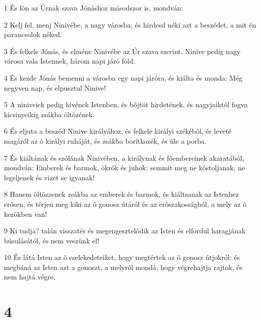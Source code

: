 \par 1 És lõn az Úrnak szava Jónáshoz másodszor is, mondván:
\par 2 Kelj fel, menj Ninivébe, a nagy városba, és hirdesd néki azt a beszédet, a mit én parancsolok néked.
\par 3 És felkele Jónás, és elméne Ninivébe az Úr szava szerint. Ninive pedig nagy városa vala Istennek, három napi járó föld.
\par 4 És kezde Jónás bemenni a városba egy napi járóra, és kiálta és monda: Még negyven nap, és elpusztul Ninive!
\par 5 A niniveiek pedig hivének Istenben, és bõjtöt hirdetének, és nagyjaiktól fogva kicsinyeikig zsákba öltözének.
\par 6 És eljuta a beszéd Ninive királyához, és felkele királyi székébõl, és leveté magáról az õ királyi ruháját, és zsákba borítkozék, és üle a porba.
\par 7 És kiáltának és szólának Ninivében, a királynak és fõembereinek akaratából, mondván: Emberek és barmok, ökrök és juhok: semmit meg ne kóstoljanak, ne legeljenek és vizet se igyanak!
\par 8 Hanem öltözzenek zsákba az emberek és barmok, és kiáltsanak az Istenhez erõsen, és térjen meg kiki az õ gonosz útáról és az erõszakosságból, a mely az õ kezökben van!
\par 9 Ki tudja? talán visszatér és megengesztelõdik az Isten és elfordul haragjának búsulásától, és nem veszünk el!
\par 10 És látá Isten az õ cselekedeteiket, hogy megtértek az õ gonosz útjokról: és megbáná az Isten azt a gonoszt, a melyrõl mondá, hogy végrehajtja rajtok, és nem hajtá végre.

\chapter{4}

